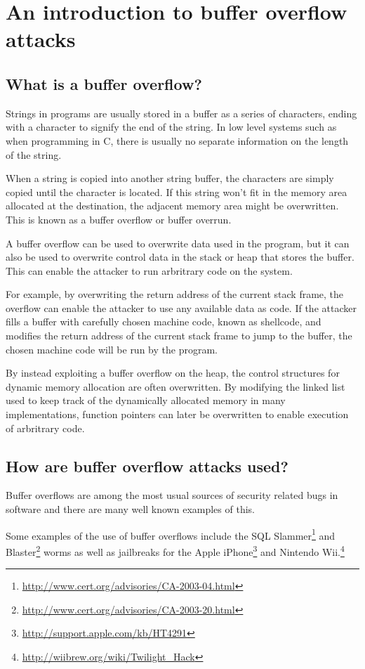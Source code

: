 \section{An introduction to buffer overflow attacks}
\subsection{What is a buffer overflow?}
Strings in programs are usually stored in a buffer as a series of characters,
ending with a  character to signify the end of the string.
In low level systems such as when programming in C,
there is usually no separate information on the length of the string.

When a string is copied into another string buffer,
the characters are simply copied until
the  character is located.
If this string won't fit in the memory area allocated at the destination,
the adjacent memory area might be overwritten.
This is known as a buffer overflow or buffer overrun.

A buffer overflow can be used to overwrite data used in the program,
but it can also be used to overwrite control data in the stack or heap
that stores the buffer.
This can enable the attacker to run arbritrary code on the system.

For example, by overwriting the return address of the current stack frame,
the overflow can enable the attacker to use any available data as code.
If the attacker fills a buffer with carefully chosen machine code,
known as shellcode,
and modifies the return address of the current stack frame
to jump to the buffer,
the chosen machine code will be run by the program.

By instead exploiting a buffer overflow on the heap,
the control structures for dynamic memory allocation are often overwritten.
By modifying the linked list used to keep track of
the dynamically allocated memory in many  implementations,
function pointers can later be overwritten to enable
execution of arbritrary code.

\subsection{How are buffer overflow attacks used?}
Buffer overflows are among the most usual sources of
security related bugs in software and
there are many well known examples of this.

Some examples of the use of buffer overflows include the
SQL Slammer\footnote{\url{http://www.cert.org/advisories/CA-2003-04.html}}
and Blaster\footnote{\url{http://www.cert.org/advisories/CA-2003-20.html}}
worms as well as jailbreaks
for the Apple iPhone\footnote{\url{http://support.apple.com/kb/HT4291}}
and Nintendo Wii.\footnote{\url{http://wiibrew.org/wiki/Twilight\_Hack}}

